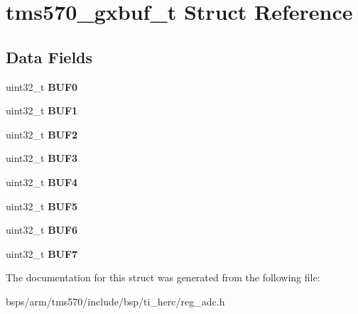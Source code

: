 \hypertarget{structtms570__gxbuf__t}{}\section{tms570\+\_\+gxbuf\+\_\+t Struct Reference}
\label{structtms570__gxbuf__t}
\subsection*{Data Fields}
\begin{DoxyCompactItemize}
\item 
\mbox{\label{structtms570__gxbuf__t_a1dd8982d39e9f9ca6e005fc90fa2e12e}} 
uint32\+\_\+t {\bfseries B\+U\+F0}
\item 
\mbox{\label{structtms570__gxbuf__t_aa1a3c296fd5ebe8538ff5b9cdb89ea51}} 
uint32\+\_\+t {\bfseries B\+U\+F1}
\item 
\mbox{\label{structtms570__gxbuf__t_adf690767c95ed5dc5b934653f6c75522}} 
uint32\+\_\+t {\bfseries B\+U\+F2}
\item 
\mbox{\label{structtms570__gxbuf__t_a6de934ec1ab85f9a916e5d1f22d77a48}} 
uint32\+\_\+t {\bfseries B\+U\+F3}
\item 
\mbox{\label{structtms570__gxbuf__t_a2ef968df80bdd34882682dec1c83e7d8}} 
uint32\+\_\+t {\bfseries B\+U\+F4}
\item 
\mbox{\label{structtms570__gxbuf__t_a31abb8c2b1317c7c2f81de4741a94cc6}} 
uint32\+\_\+t {\bfseries B\+U\+F5}
\item 
\mbox{\label{structtms570__gxbuf__t_ac1527a5ff2a26a1e71711094ca8153fd}} 
uint32\+\_\+t {\bfseries B\+U\+F6}
\item 
\mbox{\label{structtms570__gxbuf__t_aba94492054f1947853cd87a1f01d46a7}} 
uint32\+\_\+t {\bfseries B\+U\+F7}
\end{DoxyCompactItemize}


The documentation for this struct was generated from the following file\+:\begin{DoxyCompactItemize}
\item 
bsps/arm/tms570/include/bsp/ti\+\_\+herc/reg\+\_\+adc.\+h\end{DoxyCompactItemize}
